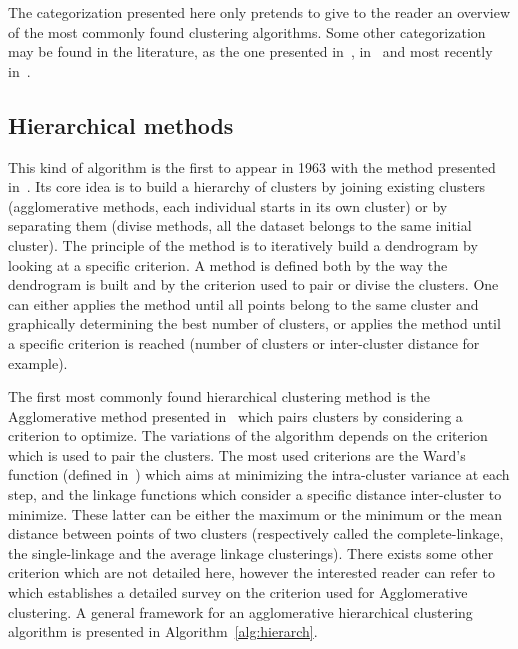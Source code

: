     The categorization presented here only pretends to give to the reader an overview of the most commonly found clustering algorithms. Some other categorization may be found in the literature, as the one presented in~\cite{jain1999data}, in~\cite{xu2005survey} and most recently in~\cite{fahad2014survey}.

    \subsection{Hierarchical methods}

    This kind of algorithm is the first to appear in 1963 with the method presented in~\cite{ward1963hierarchical}. Its core idea is to build a hierarchy of clusters by joining existing clusters (agglomerative methods, each individual starts in its own cluster) or by separating them (divise methods, all the dataset belongs to the same initial cluster). The principle of the method is to iteratively build a dendrogram by looking at a specific criterion. A method is defined both by the way the dendrogram is built and by the criterion used to pair or divise the clusters. One can either applies the method until all points belong to the same cluster and graphically determining the best number of clusters, or applies the method until a specific criterion is reached (number of clusters or inter-cluster distance for example).

    The first most commonly found hierarchical clustering method is the Agglomerative method presented in~\cite{ward1963hierarchical} which pairs clusters by considering a criterion to optimize. The variations of the algorithm depends on the criterion which is used to pair the clusters. The most used criterions are the Ward's function (defined in~\cite{ward1963hierarchical}) which aims at minimizing the intra-cluster variance at each step, and the linkage functions which consider a specific distance inter-cluster to minimize. These latter can be either the maximum or the minimum or the mean distance between points of two clusters (respectively called the complete-linkage, the single-linkage and the average linkage clusterings). There exists some other criterion which are not detailed here, however the interested reader can refer to~\cite{murtagh1983survey} which establishes a detailed survey on the criterion used for Agglomerative clustering. A general framework for an agglomerative hierarchical clustering algorithm is presented in Algorithm~\ref{alg:hierarch}.\\

